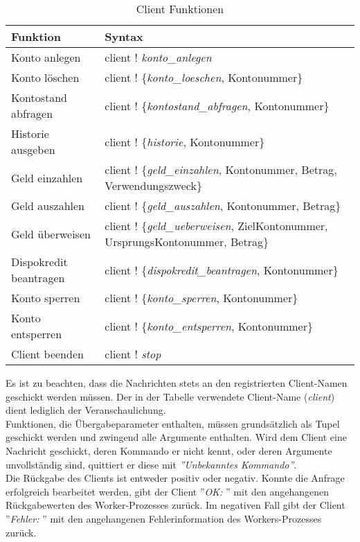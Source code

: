 \begin{table}[H]
\caption{Client Funktionen}
\begin{center}
\begin{tabular}[t]{l|l}
\textbf{Funktion} 	& \textbf{Syntax} \\
\hline
\hline
Konto anlegen 			& client ! \textit{konto\_anlegen}\\
\hline
Konto löschen 			& client ! \{\textit{konto\_loeschen}, Kontonummer\}\\
\hline
Kontostand abfragen 	& client ! \{\textit{kontostand\_abfragen}, Kontonummer\}\\
\hline
Historie ausgeben 		& client ! \{\textit{historie}, Kontonummer\}\\
\hline
Geld einzahlen			& client ! \{\textit{geld\_einzahlen}, Kontonummer, Betrag, Verwendungszweck\}\\
\hline
Geld auszahlen 			& client ! \{\textit{geld\_auszahlen}, Kontonummer, Betrag\}\\
\hline
Geld überweisen 		& client ! \{\textit{geld\_ueberweisen}, ZielKontonummer,
UrsprungsKontonummer, Betrag\}\\
\hline
Dispokredit beantragen 	& client ! \{\textit{dispokredit\_beantragen}, Kontonummer\}\\
\hline
Konto sperren 			& client ! \{\textit{konto\_sperren}, Kontonummer\}\\
\hline
Konto entsperren 		& client ! \{\textit{konto\_entsperren}, Kontonummer\}\\
\hline
Client beenden 			& client ! \textit{stop}
\end{tabular}
\end{center}
\end{table}
$\;$ \\
Es ist zu beachten, dass die Nachrichten stets an den registrierten Client-Namen geschickt werden müssen. Der in der Tabelle verwendete Client-Name (\textit{client}) dient lediglich der Veranschaulichung.\\
Funktionen, die Übergabeparameter enthalten, müssen grundsätzlich als Tupel geschickt werden und zwingend alle Argumente enthalten. Wird dem Client eine Nachricht geschickt, deren Kommando er nicht kennt, oder deren Argumente unvollständig sind, quittiert er diese mit \textit{''Unbekanntes Kommando''}.\\
Die Rückgabe des Clients ist entweder positiv oder negativ. Konnte die Anfrage erfolgreich bearbeitet werden, gibt der Client ''\textit{OK: }'' mit den angehangenen Rückgabewerten des Worker-Prozesses zurück. Im negativen Fall gibt der Client ''\textit{Fehler: }'' mit den angehangenen Fehlerinformation des Workers-Prozesses zurück.\\
